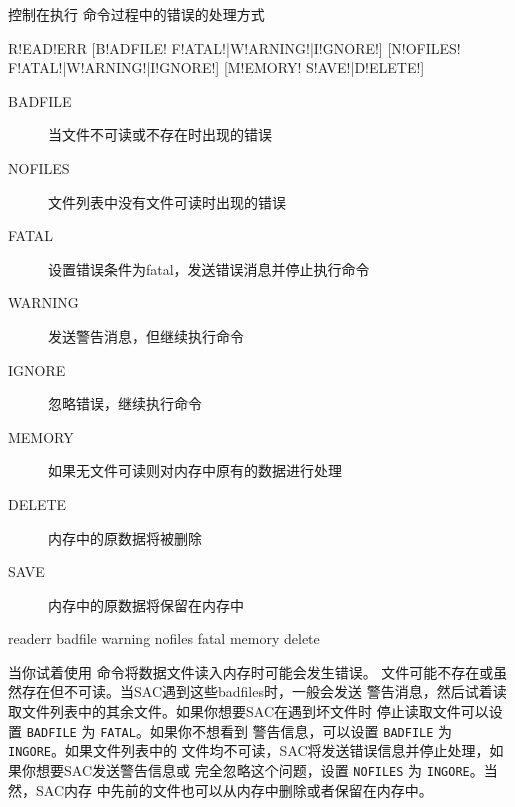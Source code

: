 \label{cmd:readerr}

控制在执行  命令过程中的错误的处理方式

\begin{SACSTX}
R!EAD!ERR [B!ADFILE! F!ATAL!|W!ARNING!|I!GNORE!] [N!OFILES! F!ATAL!|W!ARNING!|I!GNORE!]
          [M!EMORY! S!AVE!|D!ELETE!]
\end{SACSTX}

\begin{description}
\item [BADFILE] 当文件不可读或不存在时出现的错误
\item [NOFILES] 文件列表中没有文件可读时出现的错误
\item [FATAL] 设置错误条件为fatal，发送错误消息并停止执行命令
\item [WARNING] 发送警告消息，但继续执行命令
\item [IGNORE] 忽略错误，继续执行命令
\item [MEMORY] 如果无文件可读则对内存中原有的数据进行处理
\item [DELETE] 内存中的原数据将被删除
\item [SAVE] 内存中的原数据将保留在内存中
\end{description}

\begin{SACDFT}
readerr badfile warning nofiles fatal memory delete
\end{SACDFT}

当你试着使用  命令将数据文件读入内存时可能会发生错误。
文件可能不存在或虽然存在但不可读。当SAC遇到这些badfiles时，一般会发送
警告消息，然后试着读取文件列表中的其余文件。如果你想要SAC在遇到坏文件时
停止读取文件可以设置 \texttt{BADFILE} 为 \texttt{FATAL}。如果你不想看到
警告信息，可以设置 \texttt{BADFILE} 为 \texttt{INGORE}。如果文件列表中的
文件均不可读，SAC将发送错误信息并停止处理，如果你想要SAC发送警告信息或
完全忽略这个问题，设置 \texttt{NOFILES} 为 \texttt{INGORE}。当然，SAC内存
中先前的文件也可以从内存中删除或者保留在内存中。

